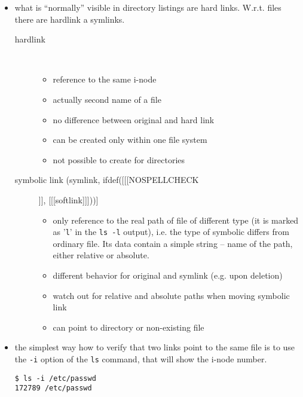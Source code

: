 \begin{itemize}
\item what is ``normally'' visible in directory listings are hard links.
W.r.t. files there are  hardlink a symlinks.

\begin{description}
\item[hardlink]~

    \begin{itemize}
    \item reference to the same i-node
    \item actually second name of a file
    \item no difference between original and hard link
    \item can be created only within one file system
    \item not possible to create for directories
    \end{itemize}
\item [symbolic link (symlink, ifdef([[[NOSPELLCHECK]]], [[[softlink]]]))]~

    \begin{itemize}
    \item only reference to the real path of file of different type
    (it is marked as '\texttt{l}' in the \texttt{ls -l} output), i.e. the type
    of symbolic differs from ordinary file. Its data contain a simple string
    -- name of the path, either relative or absolute.
    \item different behavior for original and symlink (e.g. upon deletion)
    \item watch out for relative and absolute paths when moving symbolic link
    \item can point to directory or non-existing file
    \end{itemize}
\end{description}

\item the simplest way how to verify that two links point to the same file is to
use the \texttt{-i} option of the \texttt{ls} command, that will show the i-node
number.

\begin{verbatim}
$ ls -i /etc/passwd
172789 /etc/passwd
\end{verbatim}
\end{itemize}


